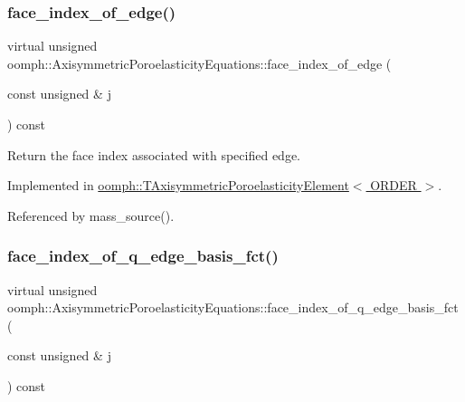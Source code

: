 \subsubsection{\texorpdfstring{face\+\_\+index\+\_\+of\+\_\+edge()}{face\_index\_of\_edge()}}
{\footnotesize\ttfamily virtual unsigned oomph\+::\+Axisymmetric\+Poroelasticity\+Equations\+::face\+\_\+index\+\_\+of\+\_\+edge (\begin{DoxyParamCaption}\item[{const unsigned \&}]{j }\end{DoxyParamCaption}) const\hspace{0.3cm}{\ttfamily [pure virtual]}}



Return the face index associated with specified edge. 



Implemented in \hyperlink{classoomph_1_1TAxisymmetricPoroelasticityElement_a5c977c1abd1bf1a479a15491b0dbb0c2}{oomph\+::\+T\+Axisymmetric\+Poroelasticity\+Element$<$ O\+R\+D\+E\+R $>$}.



Referenced by mass\+\_\+source().

\mbox{\label{classoomph_1_1AxisymmetricPoroelasticityEquations_a69ee55cdbcfc2db8593ff8f6ea8fd58d}} 
\subsubsection{\texorpdfstring{face\+\_\+index\+\_\+of\+\_\+q\+\_\+edge\+\_\+basis\+\_\+fct()}{face\_index\_of\_q\_edge\_basis\_fct()}}
{\footnotesize\ttfamily virtual unsigned oomph\+::\+Axisymmetric\+Poroelasticity\+Equations\+::face\+\_\+index\+\_\+of\+\_\+q\+\_\+edge\+\_\+basis\+\_\+fct (\begin{DoxyParamCaption}\item[{const unsigned \&}]{j }\end{DoxyParamCaption}) const\hspace{0.3cm}{\ttfamily [pure virtual]}}



